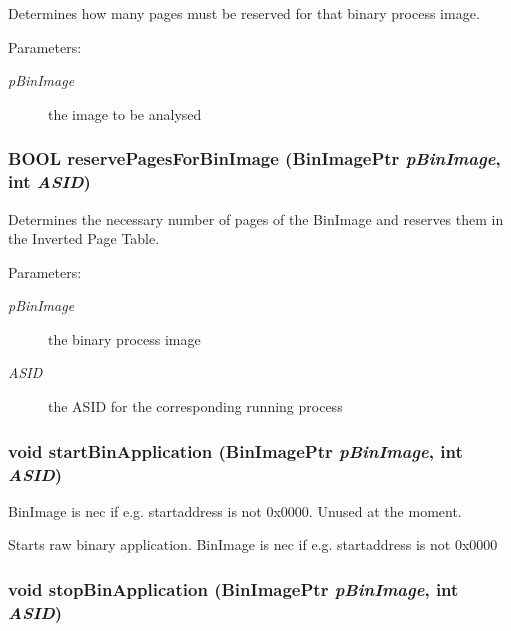 Determines how many pages must be reserved for that binary process image. \begin{Desc}
\item[Parameters:]
\begin{description}
\item[{\em pBinImage}]the image to be analysed \end{description}
\end{Desc}
\hypertarget{group___v_m_m___l_d_r_g0b60ccd1a0871b94620f9206fc9e86a6}{
\subsubsection[{reservePagesForBinImage}]{\setlength{\rightskip}{0pt plus 5cm}BOOL reservePagesForBinImage (BinImagePtr {\em pBinImage}, \/  int {\em ASID})}}
\label{group___v_m_m___l_d_r_g0b60ccd1a0871b94620f9206fc9e86a6}


Determines the necessary number of pages of the BinImage and reserves them in the Inverted Page Table. \begin{Desc}
\item[Parameters:]
\begin{description}
\item[{\em pBinImage}]the binary process image \item[{\em ASID}]the ASID for the corresponding running process \end{description}
\end{Desc}
\hypertarget{group___v_m_m___l_d_r_gee5032b8bccc629d554bd321d74a71a5}{
\subsubsection[{startBinApplication}]{\setlength{\rightskip}{0pt plus 5cm}void startBinApplication (BinImagePtr {\em pBinImage}, \/  int {\em ASID})}}
\label{group___v_m_m___l_d_r_gee5032b8bccc629d554bd321d74a71a5}


BinImage is nec if e.g. startaddress is not 0x0000. Unused at the moment.

Starts raw binary application. BinImage is nec if e.g. startaddress is not 0x0000 \hypertarget{group___v_m_m___l_d_r_gfa3edc54147d22b0e8e45491140576cb}{
\subsubsection[{stopBinApplication}]{\setlength{\rightskip}{0pt plus 5cm}void stopBinApplication (BinImagePtr {\em pBinImage}, \/  int {\em ASID})}}
\label{group___v_m_m___l_d_r_gfa3edc54147d22b0e8e45491140576cb}


